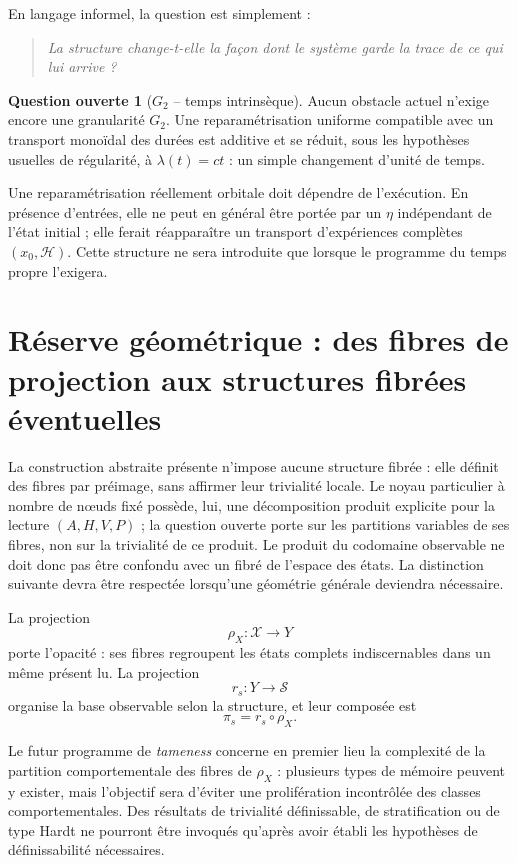 \documentclass[11pt,a4paper]{article}
\theoremstyle{definition}
\newtheorem{question}[definition]{Question ouverte}
\theoremstyle{remark}
\newcommand{\X}{\mathcal X}
\newcommand{\Sstruct}{\mathcal S}
\begin{document}
En langage informel, la question est simplement :
\begin{quote}
\emph{La structure change-t-elle la façon dont le système garde la trace de ce qui lui arrive ?}
\end{quote}

\begin{question}[$G_2$ -- temps intrinsèque]
Aucun obstacle actuel n'exige encore une granularité $G_2$. Une reparamétrisation uniforme compatible avec un transport monoïdal des durées est additive et se réduit, sous les hypothèses usuelles de régularité, à $\lambda(t)=ct$ : un simple changement d'unité de temps.

Une reparamétrisation réellement orbitale doit dépendre de l'exécution. En présence d'entrées, elle ne peut en général être portée par un $\eta$ indépendant de l'état initial ; elle ferait réapparaître un transport d'expériences complètes $(x_0,\mathcal H)$. Cette structure ne sera introduite que lorsque le programme du temps propre l'exigera.
\end{question}

\section{Réserve géométrique : des fibres de projection aux structures fibrées éventuelles}

La construction abstraite présente n'impose aucune structure fibrée : elle définit des fibres par préimage, sans affirmer leur trivialité locale. Le noyau particulier à nombre de nœuds fixé possède, lui, une décomposition produit explicite pour la lecture $(A,H,V,P)$ ; la question ouverte porte sur les partitions variables de ses fibres, non sur la trivialité de ce produit. Le produit du codomaine observable ne doit donc pas être confondu avec un fibré de l'espace des états. La distinction suivante devra être respectée lorsqu'une géométrie générale deviendra nécessaire.

La projection
\[
\rho_X:\X\to Y
\]
porte l'opacité : ses fibres regroupent les états complets indiscernables dans un même présent lu. La projection
\[
r_s:Y\to\Sstruct
\]
organise la base observable selon la structure, et leur composée est
\[
\pi_s=r_s\circ\rho_X.
\]

Le futur programme de \emph{tameness} concerne en premier lieu la complexité de la partition comportementale des fibres de $\rho_X$ : plusieurs types de mémoire peuvent y exister, mais l'objectif sera d'éviter une prolifération incontrôlée des classes comportementales. Des résultats de trivialité définissable, de stratification ou de type Hardt ne pourront être invoqués qu'après avoir établi les hypothèses de définissabilité nécessaires.
\end{document}
